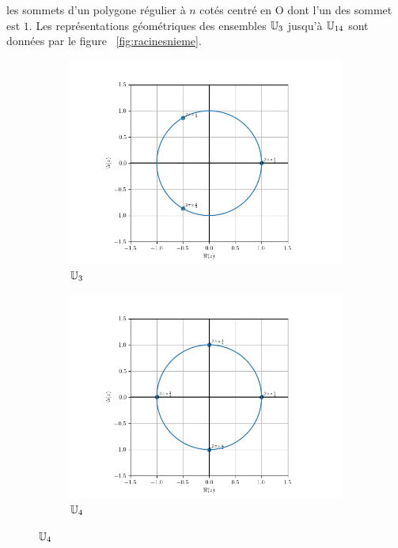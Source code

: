 les sommets d'un polygone régulier à \(n\) cotés centré en O dont l'un des 
sommet est \(1\). Les représentations géométriques des ensembles \(\mathbb{U}_3\) 
jusqu'à \(\mathbb{U}_{14}\) sont données par le figure~
\ref{fig:racinesnieme}.
\begin{figure}
    \begin{subfigure}{.3\textwidth}
        \centering
        \includegraphics[scale=.33]{U_3.png}  
        \caption{$\mathbb{U}_3$}
        \label{fig:U3}
    \end{subfigure}
    \begin{subfigure}{.3\textwidth}
        \centering
        \includegraphics[scale=.33]{U_4.png}  
        \caption{$\mathbb{U}_4$}

\end{subfigure}
\end{figure}
